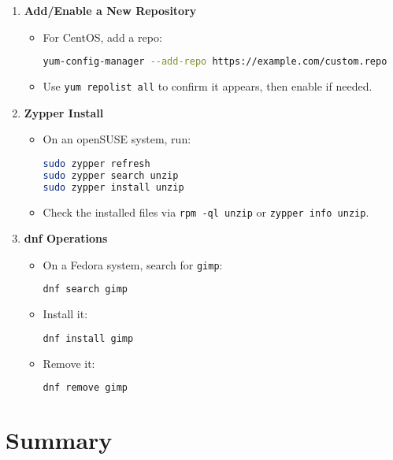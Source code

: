 \documentclass[12pt,a4paper]{report}
\begin{document}
\begin{enumerate}
    \item \textbf{Add/Enable a New Repository}
    \begin{itemize}
        \item For CentOS, add a repo:
        \begin{lstlisting}[language=bash]
yum-config-manager --add-repo https://example.com/custom.repo
        \end{lstlisting}
        \item Use \texttt{yum repolist all} to confirm it appears, then enable if needed.
    \end{itemize}

    \item \textbf{Zypper Install}
    \begin{itemize}
        \item On an openSUSE system, run:
        \begin{lstlisting}[language=bash]
sudo zypper refresh
sudo zypper search unzip
sudo zypper install unzip
        \end{lstlisting}
        \item Check the installed files via \texttt{rpm -ql unzip} or \texttt{zypper info unzip}.
    \end{itemize}

    \item \textbf{dnf Operations}
    \begin{itemize}
        \item On a Fedora system, search for \texttt{gimp}:
        \begin{lstlisting}[language=bash]
dnf search gimp
        \end{lstlisting}
        \item Install it:
        \begin{lstlisting}[language=bash]
dnf install gimp
        \end{lstlisting}
        \item Remove it:
        \begin{lstlisting}[language=bash]
dnf remove gimp
        \end{lstlisting}
    \end{itemize}
\end{enumerate}

\section*{Summary}
\end{document}
